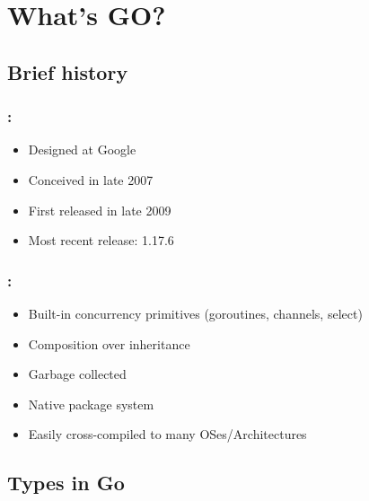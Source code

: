 \section{What's GO?}

\subsection{Brief history}

\begin{frame}
    \frametitle{\secname: \small\subsecname\normalsize}

    \begin{itemize}
        \item Designed at Google
        \item Conceived in late 2007
        \item First released in late 2009
        \item Most recent release: 1.17.6
    \end{itemize}

\end{frame}

\begin{frame}
    \frametitle{\secname: \small\subsecname\normalsize}

    \begin{itemize}
        \item Built-in concurrency primitives (goroutines, channels, select)
        \item Composition over inheritance
        \item Garbage collected
        \item Native package system
        \item Easily cross-compiled to many OSes/Architectures
    \end{itemize}

\end{frame}

\subsection{Types in Go}


